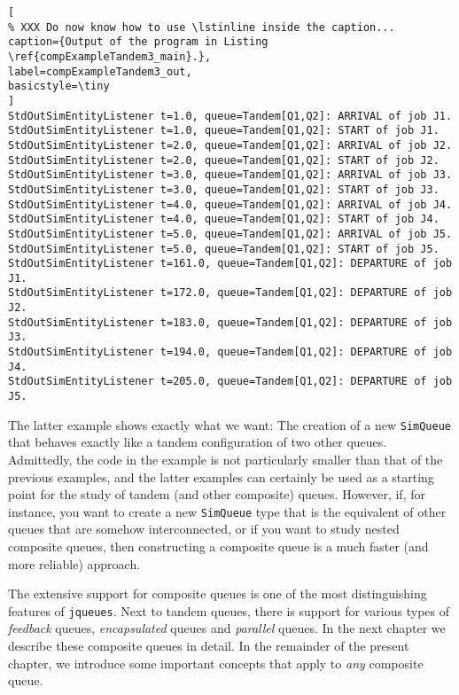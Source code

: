\documentclass[12pt]{book}
\begin{document}
\begin{lstlisting}[
% XXX Do now know how to use \lstinline inside the caption...
caption={Output of the program in Listing \ref{compExampleTandem3_main}.},
label=compExampleTandem3_out,
basicstyle=\tiny
]
StdOutSimEntityListener t=1.0, queue=Tandem[Q1,Q2]: ARRIVAL of job J1.
StdOutSimEntityListener t=1.0, queue=Tandem[Q1,Q2]: START of job J1.
StdOutSimEntityListener t=2.0, queue=Tandem[Q1,Q2]: ARRIVAL of job J2.
StdOutSimEntityListener t=2.0, queue=Tandem[Q1,Q2]: START of job J2.
StdOutSimEntityListener t=3.0, queue=Tandem[Q1,Q2]: ARRIVAL of job J3.
StdOutSimEntityListener t=3.0, queue=Tandem[Q1,Q2]: START of job J3.
StdOutSimEntityListener t=4.0, queue=Tandem[Q1,Q2]: ARRIVAL of job J4.
StdOutSimEntityListener t=4.0, queue=Tandem[Q1,Q2]: START of job J4.
StdOutSimEntityListener t=5.0, queue=Tandem[Q1,Q2]: ARRIVAL of job J5.
StdOutSimEntityListener t=5.0, queue=Tandem[Q1,Q2]: START of job J5.
StdOutSimEntityListener t=161.0, queue=Tandem[Q1,Q2]: DEPARTURE of job J1.
StdOutSimEntityListener t=172.0, queue=Tandem[Q1,Q2]: DEPARTURE of job J2.
StdOutSimEntityListener t=183.0, queue=Tandem[Q1,Q2]: DEPARTURE of job J3.
StdOutSimEntityListener t=194.0, queue=Tandem[Q1,Q2]: DEPARTURE of job J4.
StdOutSimEntityListener t=205.0, queue=Tandem[Q1,Q2]: DEPARTURE of job J5.
\end{lstlisting}

The latter example shows exactly what we want:
  The creation of a new \lstinline|SimQueue|
  that behaves exactly like a tandem configuration of two other queues.
Admittedly, the code in the example is not particularly smaller
  than that of the previous examples,
  and the latter examples can certainly be used as a starting point
  for the study of tandem (and other composite) queues.
However, if, for instance, you want to create a new \lstinline|SimQueue| type
  that is the equivalent of other queues that are somehow interconnected,
  or if you want to study nested composite queues,
  then constructing a composite queue is a much faster
  (and more reliable) approach.

The extensive support for composite queues
  is one of the most distinguishing features of \lstinline|jqueues|.
Next to tandem queues, there is support for various types of
  {\em feedback\/} queues, {\em encapsulated\/} queues
  and {\em parallel\/} queues.
In the next chapter we describe these composite queues in detail.
In the remainder of the present chapter,
  we introduce some important concepts that
  apply to {\em any\/} composite queue.
\end{document}

